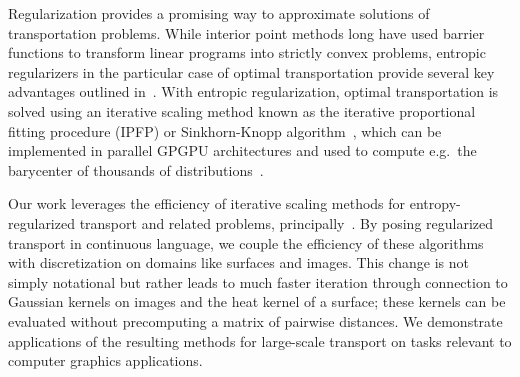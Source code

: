 Regularization provides a promising way to approximate solutions of transportation problems. While interior point methods long have used barrier functions to transform linear programs into strictly convex problems, entropic regularizers in the particular case of optimal transportation provide several key advantages outlined in~\cite{cuturi-2013}. With entropic regularization, optimal transportation is solved using an iterative scaling method known as the iterative proportional fitting procedure (IPFP) or Sinkhorn-Knopp algorithm~\cite{DemingStephanIPFP,sinkhorn1967diagonal}, which can be implemented in parallel GPGPU architectures and used to compute e.g.\ the barycenter of thousands of distributions~\cite{CuturiBarycenter}.

Our work leverages the efficiency of iterative scaling methods for entropy-regularized transport and related problems, principally~\cite{cuturi-2013,Benamou-IterBregman-2014}.  By posing regularized transport in continuous language, we couple the efficiency of these algorithms with discretization on domains like surfaces and images.  This change is not simply notational but rather leads to much faster iteration through connection to Gaussian kernels on images and the heat kernel of a surface; these kernels can be evaluated without precomputing a matrix of pairwise distances.  We demonstrate applications of the resulting methods for large-scale transport on tasks relevant to computer graphics applications.


